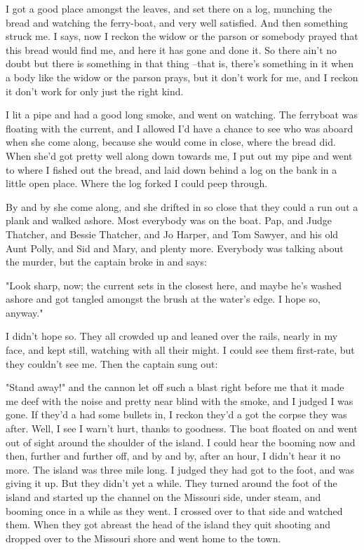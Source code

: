 I got a good place amongst the leaves, and set there on a log, munching
the bread and watching the ferry-boat, and very well satisfied.  And then
something struck me.  I says, now I reckon the widow or the parson or
somebody prayed that this bread would find me, and here it has gone and
done it.  So there ain't no doubt but there is something in that thing
--that is, there's something in it when a body like the widow or the parson
prays, but it don't work for me, and I reckon it don't work for only just
the right kind.

I lit a pipe and had a good long smoke, and went on watching.  The
ferryboat was floating with the current, and I allowed I'd have a chance
to see who was aboard when she come along, because she would come in
close, where the bread did.  When she'd got pretty well along down
towards me, I put out my pipe and went to where I fished out the bread,
and laid down behind a log on the bank in a little open place.  Where the
log forked I could peep through.

By and by she come along, and she drifted in so close that they could a
run out a plank and walked ashore.  Most everybody was on the boat.  Pap,
and Judge Thatcher, and Bessie Thatcher, and Jo Harper, and Tom Sawyer,
and his old Aunt Polly, and Sid and Mary, and plenty more.  Everybody was
talking about the murder, but the captain broke in and says:

"Look sharp, now; the current sets in the closest here, and maybe he's
washed ashore and got tangled amongst the brush at the water's edge.  I
hope so, anyway."

I didn't hope so.  They all crowded up and leaned over the rails, nearly
in my face, and kept still, watching with all their might.  I could see
them first-rate, but they couldn't see me.  Then the captain sung out:

"Stand away!" and the cannon let off such a blast right before me that it
made me deef with the noise and pretty near blind with the smoke, and I
judged I was gone.  If they'd a had some bullets in, I reckon they'd a
got the corpse they was after.  Well, I see I warn't hurt, thanks to
goodness. The boat floated on and went out of sight around the shoulder
of the island.  I could hear the booming now and then, further and
further off, and by and by, after an hour, I didn't hear it no more.  The
island was three mile long.  I judged they had got to the foot, and was
giving it up.  But they didn't yet a while.  They turned around the foot
of the island and started up the channel on the Missouri side, under
steam, and booming once in a while as they went.  I crossed over to that
side and watched them. When they got abreast the head of the island they
quit shooting and dropped over to the Missouri shore and went home to the
town.

